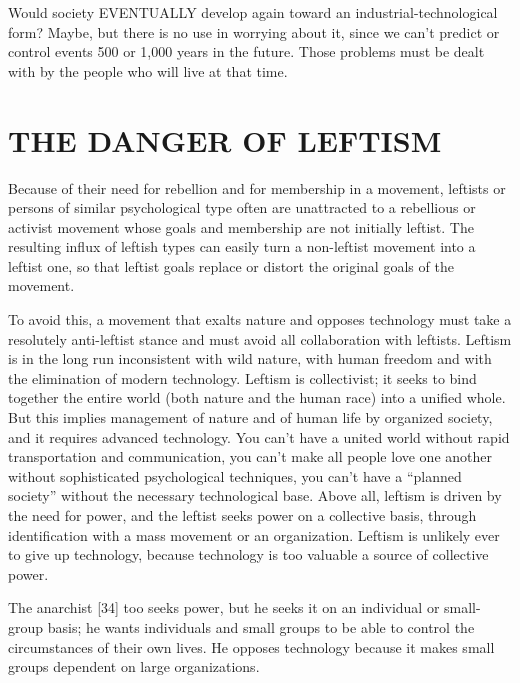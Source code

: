  Would society EVENTUALLY develop again toward an industrial-technological form? Maybe, but there is no use in worrying about it, since we can’t predict or control events 500 or 1,000 years in the future. Those problems must be dealt with by the people who will live at that time.

\chapter{THE DANGER OF LEFTISM}

 Because of their need for rebellion and for membership in a movement, leftists or persons of similar psychological type often are unattracted to a rebellious or activist movement whose goals and membership are not initially leftist. The resulting influx of leftish types can easily turn a non-leftist movement into a leftist one, so that leftist goals replace or distort the original goals of the movement.

 To avoid this, a movement that exalts nature and opposes technology must take a resolutely anti-leftist stance and must avoid all collaboration with leftists. Leftism is in the long run inconsistent with wild nature, with human freedom and with the elimination of modern technology. Leftism is collectivist; it seeks to bind together the entire world (both nature and the human race) into a unified whole. But this implies management of nature and of human life by organized society, and it requires advanced technology. You can’t have a united world without rapid transportation and communication, you can’t make all people love one another without sophisticated psychological techniques, you can’t have a “planned society” without the necessary technological base. Above all, leftism is driven by the need for power, and the leftist seeks power on a collective basis, through identification with a mass movement or an organization. Leftism is unlikely ever to give up technology, because technology is too valuable a source of collective power.

 The anarchist [34] too seeks power, but he seeks it on an individual or small-group basis; he wants individuals and small groups to be able to control the circumstances of their own lives. He opposes technology because it makes small groups dependent on large organizations.

